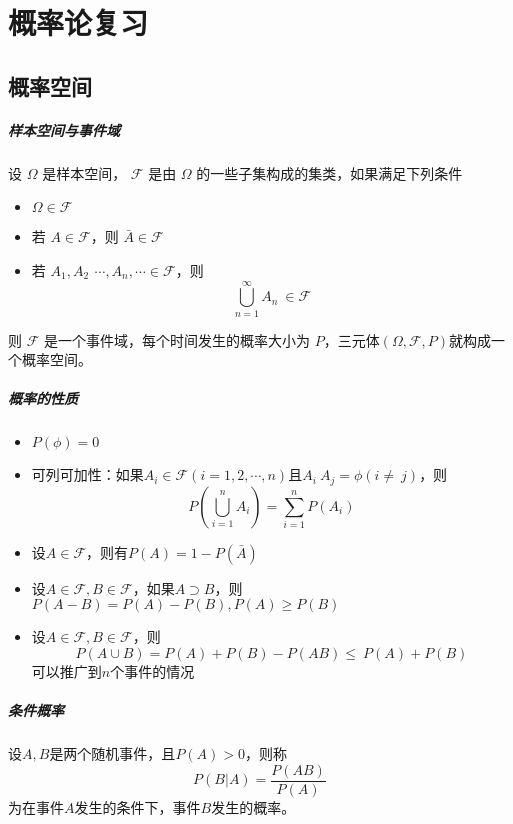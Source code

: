 \chapter{概率论复习}

\section{概率空间}

\paragraph{样本空间与事件域}
设 $\Omega$ 是样本空间， $\mathcal{F}$ 是由 $\Omega$ 的一些子集构成的集类，如果满足下列条件
\begin{itemize}
    \item $\Omega \in \mathcal{F}$
    \item 若 $A\in\mathcal{F}$，则 $\bar{A}\in\mathcal{F}$
    \item 若 $A_1,A_2\ \,\cdots,A_n,\cdots\in\mathcal{F}$，则
     $$ \bigcup_{n=1}^\infty A_n\ \in\mathcal{F} $$ 
\end{itemize}
则 $\mathcal{F}$ 是一个事件域，每个时间发生的概率大小为 $P$，三元体$(\Omega,\mathcal{F},P)$就构成一个概率空间。

\paragraph{概率的性质}
\begin{itemize}
    \item $P(\phi)=0$
	\item 可列可加性：如果$A_i\in\mathcal{F}(i=1,2,\cdots,n)$且$A_i\ A_j=\phi(i\neq\ j)$，则
     $$ P\left(\bigcup_{i=1}^n A_i \right)=\sum_{i=1}^n P(A_i )  $$ 
    \item 设$A\in\mathcal{F}$，则有$P(A)=1-P(\bar{A})$
    \item 设$A\in\mathcal{F},B\in\mathcal{F}$，如果$A\supset B$，则$P(A-B)=P(A)-P(B),P(A)\geq P(B)$
    \item 设$A\in\mathcal{F},B\in\mathcal{F}$，则
     $$ P(A\cup B)=P(A)+P(B)-P(AB)\le\ P(A)+P(B) $$ 
    可以推广到$n$个事件的情况
\end{itemize}

\paragraph{条件概率} 设$A,B$是两个随机事件，且$P(A)>0$，则称
\begin{equation}
    P(B | A)=\frac{P(AB)}{P(A)}
\end{equation}
为在事件$A$发生的条件下，事件$B$发生的概率。

